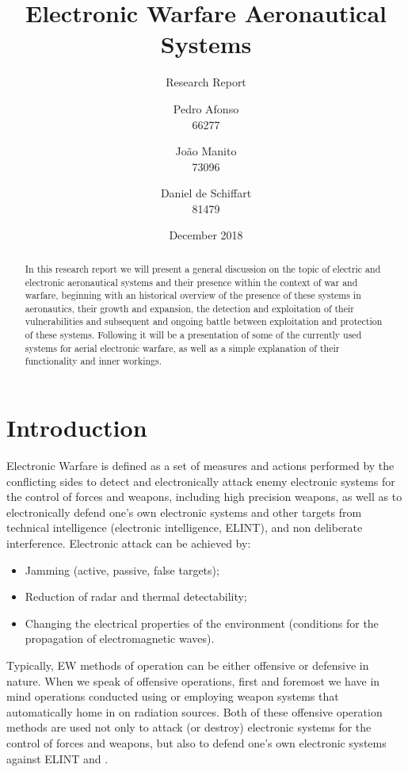 \documentclass[english,purist]{ist-report}
\author{Pedro Afonso \\ 66277 \and João Manito \\ 73096 \and Daniel de Schiffart \\ 81479}
\title{Electronic Warfare Aeronautical Systems}
\subtitle{Research Report}
\date{December 2018}
\begin{document}
\makecover{}

\begin{abstract}
	In this research report we will present a general discussion on the topic of electric and electronic aeronautical systems and their presence within the context of war and warfare, beginning with an historical overview of the presence of these systems in aeronautics, their growth and expansion, the detection and exploitation of their vulnerabilities and subsequent and ongoing battle between exploitation and protection of these systems. Following it will be a presentation of some of the currently used systems for aerial electronic warfare, as well as a simple explanation of their functionality and inner workings.
\end{abstract}

{ \tableofcontents}

\section{Introduction}\label{sec:introduction}
Electronic Warfare is defined as a set of measures and actions
performed by the conflicting sides to detect and electronically attack enemy electronic systems for the control of forces and weapons, including high precision weapons, as well as to electronically defend one's own electronic systems and other targets from technical intelligence (electronic intelligence, ELINT), \jamming{} and non deliberate interference.  
Electronic attack can be achieved by:
\begin{itemize}
    \item Jamming (active, passive, false targets);
    \item Reduction of radar and thermal detectability;
    \item Changing the electrical properties of the environment (conditions
for the propagation of electromagnetic waves). 
\end{itemize}

Typically, EW methods of operation can be either offensive or
defensive in nature. When we speak of offensive operations, first and
foremost we have in mind operations conducted using \jamming{} or employing weapon systems that automatically home in on radiation sources. Both of these offensive operation methods are used not only to attack (or destroy) electronic systems for the control of forces and weapons, but also to defend one's own electronic systems against ELINT and \jamming{}.
\end{document}
